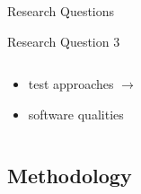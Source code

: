 \documentclass{beamer}
\begin{document}
\def\rqc{\begin{alertblock}{Research Question 3}
        \rqctext{}
    \end{alertblock}
}

\begin{frame}{Research Questions}
    \rqa{} \vspace*{\fill}
    \rqb{} \vspace*{\fill}
    \rqc{} \vspace*{\fill}
    \vspace{-4cm}
    \begin{columns}
        \begin{column}{0.4\textwidth}
            \vspace{-1cm}
            \begin{itemize}
                \item \approachCount{} test approaches $\rightarrow$
                \item \qualityCount{} software qualities
            \end{itemize}
        \end{column}
        \begin{column}{0.6\textwidth}
            \centering
        \end{column}
    \end{columns}
\end{frame}

\subsection{Methodology}
\end{document}

